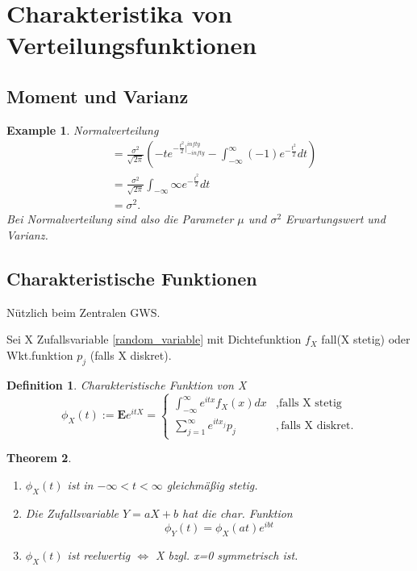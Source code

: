 \documentclass{article}
\newtheorem{theorem}{Theorem}
\newtheorem{definition}{Definition}[section]
\newtheorem{example}[theorem]{Example}
\begin{document}
\section{Charakteristika von Verteilungsfunktionen}

\subsection{Moment und Varianz}

	\begin{example}{Normalverteilung}
		\begin{align*}
			&= \frac{\sigma^2}{\sqrt{2\pi}}(-te^{-\frac{t^2}{2}|_{-infty}^{infty}} - \int_{-\infty}^{\infty}(-1)e^{-\frac{t^2}{2}}dt)\\
			&= \frac{\sigma^2}{\sqrt{2\pi}} \int_{-\infty}{\infty}e^{-\frac{t^2}{2}}dt\\
			&= \sigma^2.
		\end{align*}
		Bei Normalverteilung sind also die Parameter $\mu$ und $\sigma^2$ Erwartungswert und Varianz.
	\end{example}

\subsection{Charakteristische Funktionen}
	Nützlich beim Zentralen GWS.

	Sei X Zufallsvariable \ref{random_variable} mit Dichtefunktion $f_X$ fall(X stetig) oder Wkt.funktion $p_j$ (falls X diskret).
	\begin{definition}{Charakteristische Funktion von X}
		\[
			\phi_X(t) := \textbf{E}e^{itX} = 
					\begin{cases}
						\int_{-\infty}^{\infty}e^{itx}f_X(x)dx  &, \text{falls X stetig}\\
						\sum_{j=1}^{\infty}e^{itx_j}p_j &, \text{falls X diskret}.
					\end{cases}
		\]

	\end{definition}

	\begin{theorem}
		\begin{enumerate}
			\item $\phi_X(t)$ ist in $-\infty < t < \infty$ gleichmäßig stetig.
			\item Die Zufallsvariable $Y = aX + b$ hat die char. Funktion
				\[
					\phi_Y(t) = \phi_X(at)e^{ibt}
				\]
			\item $\phi_X(t)$ ist reelwertig $\iff$ X bzgl. x=0 symmetrisch ist.
		\end{enumerate}
	\end{theorem}
\end{document}
